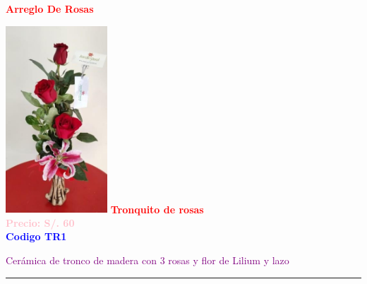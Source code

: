     \begin{center}
        \textbf{\Huge\textcolor{red}{Arreglo De Rosas}}
    \end{center}
    \begin{multicols}{2}

    \begin{minipage}{\linewidth}
        \centering
        \includegraphics[height=7cm]{imagenes_extraidas/image_7_4} %
        \newline
        \vspace{0.1cm}
        \textbf{\Large \textcolor{red}{Tronquito de rosas}} \\ %
        \vspace{0.2cm}
        \textbf{\textcolor{pink}{Precio: S/. 60}} \\ %
        \vspace{0.2cm}
        \textbf{\textcolor{blue}{Codigo TR1}} \\ %
        \vspace{0.2cm}
        \begin{minipage}{0.8\linewidth} 
            \small \textcolor{purple}{Cerámica de tronco de madera con 3 rosas y flor de Lilium y lazo} %
        \end{minipage}
        \vspace{0.1cm}        
        \rule{\linewidth}{0.5pt}
    \end{minipage}
    

\end{multicols}
